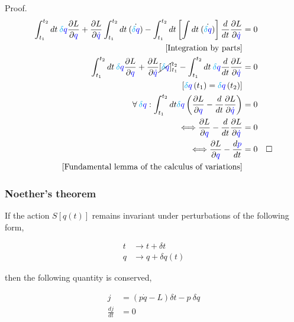 \documentclass{beamer}
\begin{document}
\begin{frame}
\begin{block}{Proof.}
\begin{align*}
\int_{t_1}^{t_2} dt \: \textcolor{cyan}{\delta} \textcolor{blue}{q} \frac{\partial L}{\partial \textcolor{blue}{q}} + \frac{\partial L}{\partial \textcolor{blue}{\dot{q}}} \int_{t_1}^{t_2} dt \: \dot{\left( \textcolor{cyan}{\delta} \textcolor{blue}{{q}}\right)} - \int_{t_1}^{t_2} dt \left[ \int dt \: \dot{\left( \textcolor{cyan}{\delta} \textcolor{blue}{{q}}\right)} \right] \frac{d}{dt} \frac{\partial L}{\partial \textcolor{blue}{\dot{q}}} & = 0 \\
\left[ \text{Integration by parts} \right] \\
\int_{t_1}^{t_2} dt \: \textcolor{cyan}{\delta} \textcolor{blue}{q} \frac{\partial L}{\partial \textcolor{blue}{q}} + \frac{\partial L}{\partial \textcolor{blue}{\dot{q}}} \cancel{\left[ \textcolor{cyan}{\delta} \textcolor{blue}{{q}}\right]}_{t_1}^{t_2} - \int_{t_1}^{t_2} dt \: \textcolor{cyan}{\delta} \textcolor{blue}{q} \frac{d}{dt} \frac{\partial L}{\partial \textcolor{blue}{\dot{q}}} & = 0 \\
\left[ \textcolor{cyan}{\delta} \textcolor{blue}{q} \left( t_1 \right) = \textcolor{cyan}{\delta} \textcolor{blue}{q} \left( t_2 \right) \right] \\
\forall \: \textcolor{cyan}{\delta} \textcolor{blue}{q} : \int_{t_1}^{t_2} dt \textcolor{cyan}{\delta} \textcolor{blue}{q} \left( \frac{\partial L}{\partial \textcolor{blue}{q}} - \frac{d}{dt} \frac{\partial L}{\partial \textcolor{blue}{\dot{q}}} \right) & = 0 \\
\Longleftrightarrow \frac{\partial L}{\partial \textcolor{blue}{q}} - \frac{d}{dt} \frac{\partial L}{\partial \textcolor{blue}{\dot{q}}} & = 0 \\
\Longleftrightarrow \frac{\partial L}{\partial \textcolor{blue}{q}} - \frac{d \textcolor{blue}{p}}{dt} & = 0 & \square \\
\left[ \text{Fundamental lemma of the calculus of variations} \right]
\end{align*}
\end{block}
\end{frame}

\begin{frame}
\frametitle{Noether's theorem}

\begin{theorem}
If the action $S \left[ q \left( t \right) \right]$ remains invariant under perturbations of the following form,

\begin{align*}
t & \to t + \delta t \\
q & \to q + \delta q \left( t \right)
\end{align*}

then the following quantity is conserved,

\begin{align*}
j & = \left( p \dot{q} - L \right) \delta t - p \: \delta q \\
\frac{dj}{dt} & = 0
\end{align*}
\end{theorem}
\end{frame}
\end{document}
